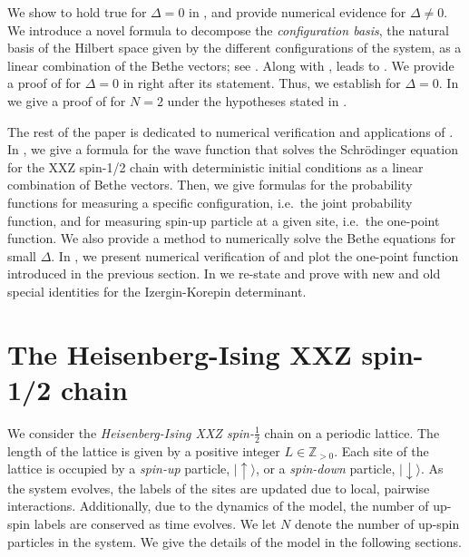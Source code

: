 \documentclass[a4paper,11pt]{article}
\theoremstyle{definition}
\begin{document}
We show  to hold true for $\Delta =0$ in , and provide numerical evidence for $\Delta \neq 0$. We introduce a novel formula to decompose the \emph{configuration basis}, the natural basis of the Hilbert space given by the different configurations of the system, as a linear combination of the Bethe vectors; see . Along with ,  leads to . We provide a proof of  for $\Delta = 0$ in  right after its statement. Thus, we establish  for $\Delta = 0$. In  we give a proof of  for $N=2$ under the hypotheses stated in .

The rest of the paper is dedicated to numerical verification and applications of . In , we give a formula for the wave function that solves the Schr\"odinger equation for the XXZ spin-1/2 chain with deterministic initial conditions as a linear combination of Bethe vectors. Then, we give formulas for the probability functions for measuring a specific configuration, i.e.~the joint probability function, and for measuring spin-up particle at a given site, i.e.~the one-point function. We also provide a method to numerically solve the Bethe equations for small $\Delta$. In , we present numerical verification of  and plot the one-point function introduced in the previous section. In  we re-state and prove  with new and old special identities for the Izergin-Korepin determinant. 


\section{The Heisenberg-Ising XXZ spin-1/2 chain}\label{s:model}


We consider the \emph{Heisenberg-Ising XXZ spin-$\tfrac{1}{2}$} chain on a periodic lattice. The length of the lattice is given by a positive integer $L \in \mathbb{Z}_{>0}$. Each site of the lattice is occupied by a \emph{spin-up} particle, $\mid\uparrow\rangle$, or a \emph{spin-down} particle, $\mid \downarrow \rangle$. As the system evolves, the labels of the sites are updated due to local, pairwise interactions. Additionally, due to the dynamics of the model, the number of up-spin labels are conserved as time evolves. We let $N$ denote the number of up-spin particles in the system. We give the details of the model in the following sections.
\end{document}
